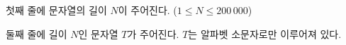 첫째 줄에 문자열의 길이 $N$이 주어진다. ($1 \le N \le 200\,000$)

둘째 줄에 길이 $N$인 문자열 $T$가 주어진다. $T$는 알파벳 소문자로만 이루어져 있다.